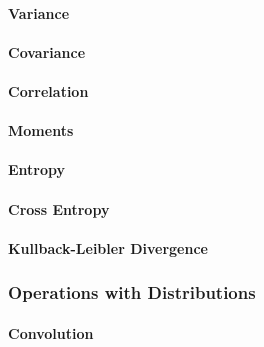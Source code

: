 \paragraph{Variance}

\paragraph{Covariance}

\paragraph{Correlation}

\paragraph{Moments}



\paragraph{Entropy}

\paragraph{Cross Entropy}


\paragraph{Kullback-Leibler Divergence}



\subsubsection{Operations with Distributions}

\paragraph{Convolution}


